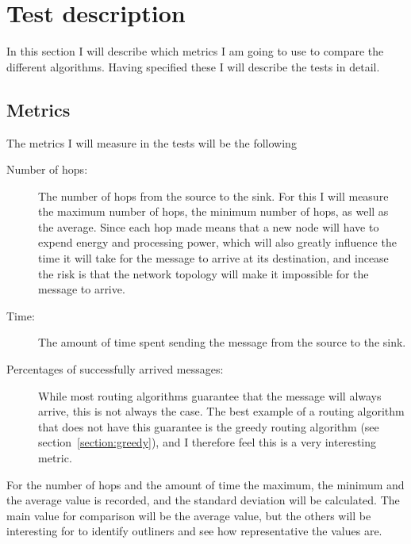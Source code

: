 \section{Test description}
\label{section:test_description}

In this section I will describe which metrics I am going to use to compare the different algorithms. Having specified these I will describe the tests in detail.

\subsection{Metrics}

The metrics I will measure in the tests will be the following
\begin{description}
\item[Number of hops:] The number of hops from the source to the sink. For this I will measure the maximum number of hops, the minimum number of hops, as well as the average. Since each hop made means that a new node will have to expend energy and processing power, which will also greatly influence the time it will take for the message to arrive at its destination, and incease the risk is that the network topology will make it impossible for the message to arrive.

\item[Time:] The amount of time spent sending the message from the source to the sink. 

\item[Percentages of successfully arrived messages:] While most routing algorithms guarantee that the message will always arrive, this is not always the case. The best example of a routing algorithm that does not have this guarantee is the greedy routing algorithm (see section~\ref{section:greedy}), and I therefore feel this is a very interesting metric.
\end{description}

For the number of hops and the amount of time the maximum, the minimum and the average value is recorded, and the standard deviation will be calculated. The main value for comparison will be the average value, but the others will be interesting for to identify outliners and see how representative the values are.

